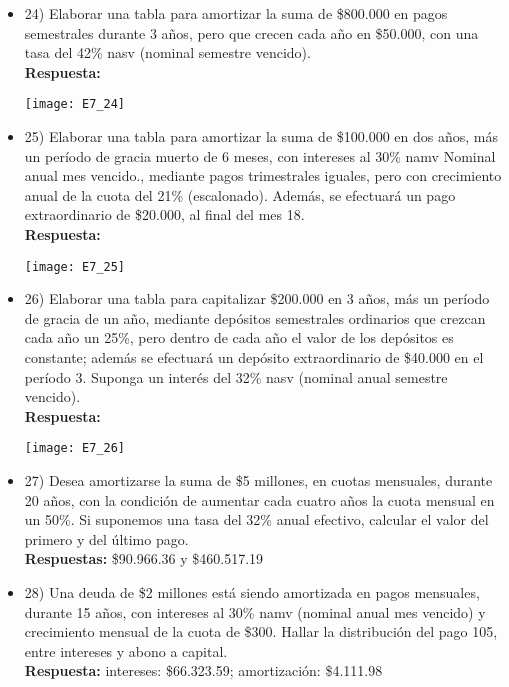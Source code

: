 \begin{itemize}
	\item 24)	 Elaborar una tabla para amortizar la suma de \$800.000 en pagos semestrales durante 3 años, pero que crecen cada año en \$50.000, con una tasa del 42\% nasv (nominal semestre vencido).\\
	\textbf{Respuesta:}
	\begin{center}
		\texttt{[image: E7\_24]}
	\end{center}
	\medskip
	
	\item 25)	 Elaborar una tabla para amortizar la suma de \$100.000 en dos años, más un período de gracia muerto de 6 meses, con intereses al 30\% namv Nominal anual mes vencido., mediante pagos trimestrales iguales, pero con crecimiento anual de la cuota del 21\% (escalonado). Además, se efectuará un pago extraordinario de \$20.000, al final del mes 18.\\
	\textbf{Respuesta:}
	\begin{center}
		\texttt{[image: E7\_25]}
	\end{center}
	\medskip
	
	\item 26)	 Elaborar una tabla para capitalizar \$200.000 en 3 años, más un período de gracia de un año, mediante depósitos semestrales ordinarios que crezcan cada año un 25\%, pero dentro de cada año el valor de los depósitos es constante; además se efectuará un depósito extraordinario de \$40.000 en el período 3. Suponga un interés del 32\% nasv (nominal anual semestre vencido).\\
	\textbf{Respuesta:}
	\begin{center}
		\texttt{[image: E7\_26]}
	\end{center}
	\medskip
	
	\item 27)	 Desea amortizarse la suma de \$5 millones, en cuotas mensuales, durante 20 años, con la condición de aumentar cada cuatro años la cuota mensual en un 50\%. Si suponemos una tasa del 32\% anual efectivo, calcular el valor del primero y del último pago. \\
	\textbf{Respuestas:} \$90.966.36 y \$460.517.19
	\medskip
	
	\item 28)	 Una deuda de \$2 millones está siendo amortizada en pagos mensuales, durante 15 años, con intereses al 30\% namv (nominal anual mes vencido) y crecimiento mensual de la cuota de \$300. Hallar la distribución del pago 105, entre intereses y abono a capital.\\
	\textbf{Respuesta:} intereses: \$66.323.59; amortización: \$4.111.98
	\medskip
	

\end{itemize}
